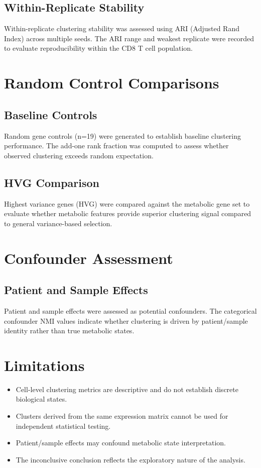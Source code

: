 \documentclass[11pt]{article}
\begin{document}
\subsection{Within-Replicate Stability}
Within-replicate clustering stability was assessed using ARI (Adjusted Rand Index) across multiple seeds. The ARI range and weakest replicate were recorded to evaluate reproducibility within the CD8 T cell population.

\section{Random Control Comparisons}

\subsection{Baseline Controls}
Random gene controls (n=19) were generated to establish baseline clustering performance. The add-one rank fraction was computed to assess whether observed clustering exceeds random expectation.

\subsection{HVG Comparison}
Highest variance genes (HVG) were compared against the metabolic gene set to evaluate whether metabolic features provide superior clustering signal compared to general variance-based selection.

\section{Confounder Assessment}

\subsection{Patient and Sample Effects}
Patient and sample effects were assessed as potential confounders. The categorical confounder NMI values indicate whether clustering is driven by patient/sample identity rather than true metabolic states.

\section{Limitations}

\begin{itemize}
    \item Cell-level clustering metrics are descriptive and do not establish discrete biological states.
    \item Clusters derived from the same expression matrix cannot be used for independent statistical testing.
    \item Patient/sample effects may confound metabolic state interpretation.
    \item The inconclusive conclusion reflects the exploratory nature of the analysis.
\end{itemize}
\end{document}
